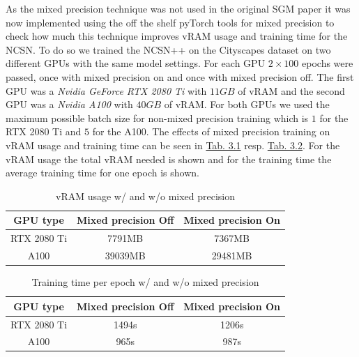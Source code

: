 As the mixed precision technique was not used in the original SGM paper \cite{score_3} it was now implemented using the off the shelf pyTorch tools for mixed precision to check how much this technique improves vRAM usage and training time for the NCSN. To do so we trained the NCSN++ on the Cityscapes dataset on two different GPUs with the same model settings. For each GPU $2\times100$ epochs were passed, once with mixed precision on and once with mixed precision off. The first GPU was a \textit{Nvidia GeForce RTX 2080 Ti} with $11GB$ of vRAM and the second GPU was a \textit{Nvidia A100} with $40GB$ of vRAM. For both GPUs we used the maximum possible batch size for non-mixed precision training which is $1$ for the RTX 2080 Ti and $5$ for the A100. The effects of mixed precision training on vRAM usage and training time can be seen in \hyperref[tab:3.1]{Tab. 3.1} resp. \hyperref[tab:3.1]{Tab. 3.2}. For the vRAM usage the total vRAM needed is shown and for the training time the average training time for one epoch is shown.
%
\begin{table}[] \label{tab:3.1}
        \centering
    \begin{tabular}{c|c|c}
        \toprule
        GPU type        & Mixed precision \textbf{Off}    & Mixed precision \textbf{On} \\
        \midrule
        RTX 2080 Ti     &  7791MB               & 7367MB\\
        A100            &  39039MB              & 29481MB\\
        \bottomrule
    \end{tabular}
    \caption{vRAM usage w/ and w/o mixed precision}
\end{table}
\begin{table}[b] \label{tab:3.2}
        \centering
    \begin{tabular}{c|c|c}
        \toprule
        GPU type        & Mixed precision \textbf{Off}    & Mixed precision \textbf{On} \\
        \midrule
        RTX 2080 Ti     &  1494s                & 1206s    \\
        A100            &  965s                 & 987s\\
        \bottomrule
    \end{tabular}
    \caption{Training time per epoch w/ and w/o mixed precision}
\end{table}

